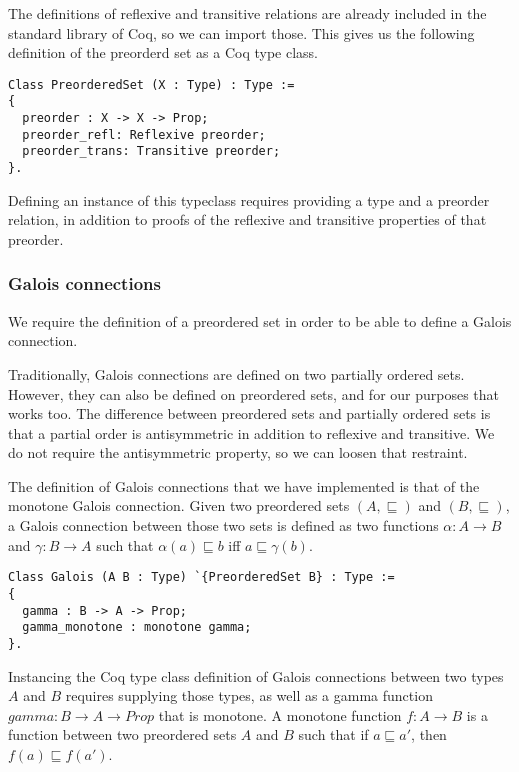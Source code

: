 The definitions of reflexive and transitive relations are already included in
the standard library of Coq, so we can import those. This gives us the
following definition of the preorderd set as a Coq type class.

\begin{verbatim}
Class PreorderedSet (X : Type) : Type :=
{
  preorder : X -> X -> Prop;
  preorder_refl: Reflexive preorder;
  preorder_trans: Transitive preorder;
}.
\end{verbatim}

Defining an instance of this typeclass requires providing a type and a preorder
relation, in addition to proofs of the reflexive and transitive properties of
that preorder. 

\subsubsection{Galois connections}
We require the definition of a preordered set in order to be able to define a
Galois connection.

Traditionally, Galois connections are defined on two partially ordered sets.
However, they can also be defined on preordered sets, and for our purposes that
works too. The difference between preordered sets and partially ordered sets is
that a partial order is antisymmetric in addition to reflexive and transitive.
We do not require the antisymmetric property, so we can loosen that restraint.

The definition of Galois connections that we have implemented is that of the
monotone Galois connection. Given two preordered sets $(A,\sqsubseteq)$ and
$(B,\sqsubseteq)$, a Galois connection between those two sets is defined as two
functions $\alpha : A \rightarrow B$ and $\gamma : B \rightarrow A$ such 
that $\alpha(a)
\sqsubseteq b$ iff $a \sqsubseteq \gamma(b)$.

\begin{verbatim}
Class Galois (A B : Type) `{PreorderedSet B} : Type :=
{
  gamma : B -> A -> Prop;
  gamma_monotone : monotone gamma;
}.
\end{verbatim}

Instancing the Coq type class definition of Galois connections between two
types $A$ and $B$ requires supplying those types, as well as a gamma function
$gamma : B \rightarrow A \rightarrow Prop$ that is monotone. 
A monotone function $f : A \rightarrow B$ is
a function between two preordered sets $A$ and $B$ such that if $a \sqsubseteq
a'$, then $f(a) \sqsubseteq f(a')$.

